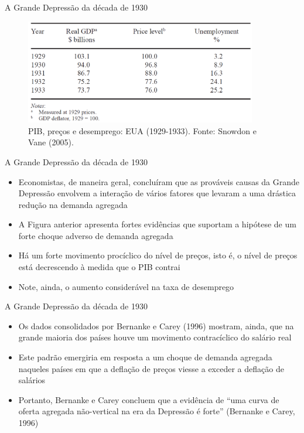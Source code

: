 \documentclass[10pt]{beamer}
\begin{document}
\begin{frame}{A Grande Depressão da década de 1930}    
    \begin{figure}
        \centering
        \includegraphics[width=0.9\textwidth]{./figures/aula4_fig1}
        \caption{PIB, preços e desemprego: EUA (1929-1933). Fonte: Snowdon e Vane (2005).}
        \label{fig1}
    \end{figure}
\end{frame}

\begin{frame}{A Grande Depressão da década de 1930}
    \begin{itemize}        
        \item Economistas, de maneira geral, concluíram que as prováveis causas da Grande Depressão envolvem a interação de vários fatores que levaram a uma drástica redução na demanda agregada\bigskip
        \item A Figura anterior apresenta fortes evidências que suportam a hipótese de um forte choque adverso de demanda agregada
        \bigskip
        \item Há um forte movimento procíclico do nível de preços, isto é, o nível de preços está decrescendo à medida que o PIB contrai
        \bigskip
        \item Note, ainda, o aumento considerável na taxa de desemprego
    \end{itemize}
\end{frame}

\begin{frame}{A Grande Depressão da década de 1930}
    \begin{itemize}
        \item Os dados consolidados por Bernanke e Carey (1996) mostram, ainda, que na grande maioria dos países houve um movimento contracíclico do salário real
        \bigskip
        \item Este padrão emergiria em resposta a um choque de demanda agregada naqueles países em que a deflação de preços viesse a exceder a deflação de salários
        \bigskip
        \item Portanto, Bernanke e Carey concluem que a evidência de ``uma curva de oferta agregada não-vertical na era da Depressão é forte'' (Bernanke e Carey, 1996)
    \end{itemize}
\end{frame}
\end{document}
